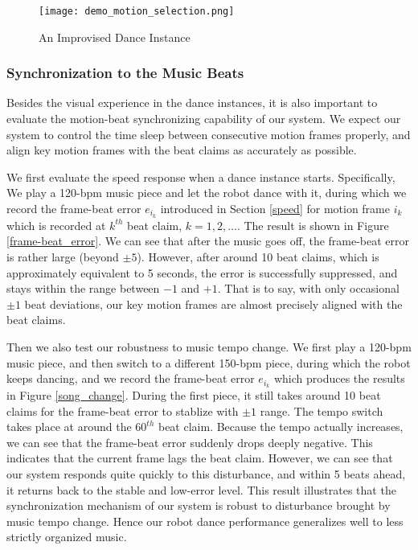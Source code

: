 \documentclass[UTF8,a4paper]{article}
\begin{document}
	\begin{figure}[htb]
		\centering
		\texttt{[image: demo\_motion\_selection.png]}
		\caption{An Improvised Dance Instance}
		\label{demo}
	\end{figure}

	\subsubsection{Synchronization to the Music Beats}

	\noindent Besides the visual experience in the dance instances, it is also important to evaluate the motion-beat synchronizing capability of our system. We expect our system to control the time sleep between consecutive motion frames properly, and align key motion frames with the beat claims as accurately as possible.

	We first evaluate the speed response when a dance instance starts. Specifically, We play a 120-bpm music piece and let the robot dance with it, during which we record the frame-beat error $e_{i_k}$ introduced in Section \ref{speed} for motion frame $i_k$ which is recorded at $k^{th}$ beat claim, $k = 1,2,\ldots$. The result is shown in Figure \ref{frame-beat_error}. We can see that after the music goes off, the frame-beat error is rather large (beyond $\pm 5$). However, after around 10 beat claims, which is approximately equivalent to 5 seconds, the error is successfully suppressed, and stays within the range between $-1$ and $+1$. That is to say, with only occasional $\pm 1$ beat deviations, our key motion frames are almost precisely aligned with the beat claims. 

	Then we also test our robustness to music tempo change. We first play a 120-bpm music piece, and then switch to a different 150-bpm piece, during which the robot keeps dancing, and we record the frame-beat error $e_{i_k}$ which produces the results in Figure \ref{song_change}. During the first piece, it still takes around 10 beat claims for the frame-beat error to stablize with $\pm 1$ range. The tempo switch takes place at around the $60^{th}$ beat claim. Because the tempo actually increases, we can see that the frame-beat error suddenly drops deeply negative. This indicates that the current frame lags the beat claim. However, we can see that our system responds quite quickly to this disturbance, and within 5 beats ahead, it returns back to the stable and low-error level. This result illustrates that the synchronization mechanism of our system is robust to disturbance brought by music tempo change. Hence our robot dance performance generalizes well to less strictly organized music.
\end{document}
